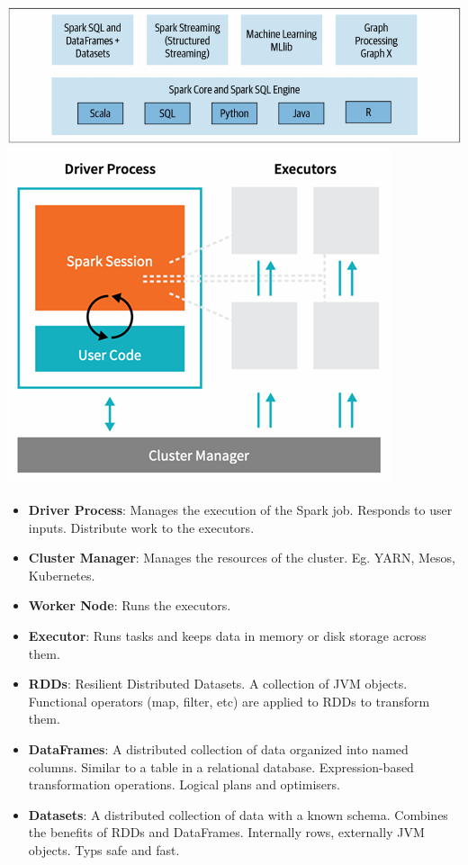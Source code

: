 \documentclass[10pt, landscape]{article}
\begin{document}
\begin{multicols*}{4}
  \includegraphics[width=0.95\linewidth]{spark_component_api_stack.png} 
  \includegraphics[width=0.95\linewidth]{spark_architecture.png} 
  \begin{itemize}
    \item \textbf{Driver Process}: Manages the execution of the Spark job. Responds to user inputs. Distribute work to the executors.
    \item \textbf{Cluster Manager}: Manages the resources of the cluster. Eg. YARN, Mesos, Kubernetes.
    \item \textbf{Worker Node}: Runs the executors.
    \item \textbf{Executor}: Runs tasks and keeps data in memory or disk storage across them.
    \item \textbf{RDDs}: Resilient Distributed Datasets. A collection of JVM objects. Functional operators (map, filter, etc) are applied to RDDs to transform them.
    \item \textbf{DataFrames}: A distributed collection of data organized into named columns. Similar to a table in a relational database. Expression-based transformation operations. Logical plans and optimisers.
    \item \textbf{Datasets}: A distributed collection of data with a known schema. Combines the benefits of RDDs and DataFrames. Internally rows, externally JVM objects. Typs safe and fast.
  \end{itemize}


\end{multicols*}
\end{document}
